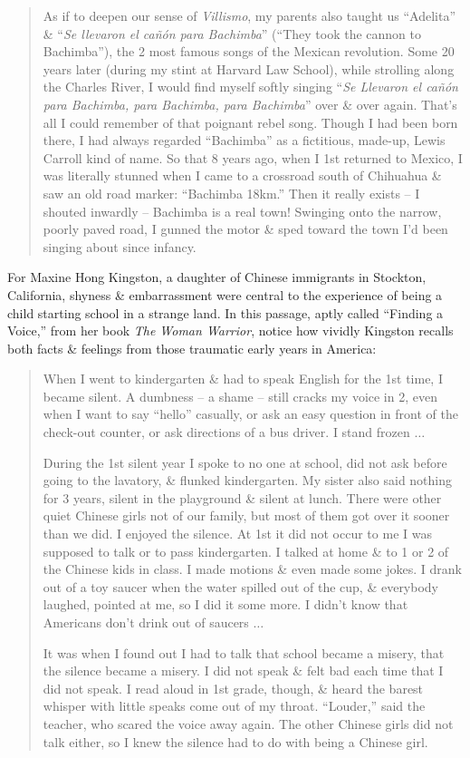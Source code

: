 \documentclass{article}
\begin{document}
\begin{quotation}
	As if to deepen our sense of \textit{Villismo}, my parents also taught us ``Adelita'' \& ``\textit{Se llevaron el ca\~{n}\'on para Bachimba}'' (``They took the cannon to Bachimba''), the 2 most famous songs of the Mexican revolution. Some 20 years later (during my stint at Harvard Law School), while strolling along the Charles River, I would find myself softly singing ``\textit{Se Llevaron el ca\~{n}\'on para Bachimba, para Bachimba, para Bachimba}'' over \& over again. That's all I could remember of that poignant rebel song. Though I had been born there, I had always regarded ``Bachimba'' as a fictitious, made-up, Lewis Carroll kind of name. So that 8 years ago, when I 1st returned to Mexico, I was literally stunned when I came to a crossroad south of Chihuahua \& saw an old road marker: ``Bachimba 18km.'' Then it really exists -- I shouted inwardly -- Bachimba is a real town! Swinging onto the narrow, poorly paved road, I gunned the motor \& sped toward the town I'd been singing about since infancy.
\end{quotation}
For Maxine Hong Kingston, a daughter of Chinese immigrants in Stockton, California, shyness \& embarrassment were central to the experience of being a child starting school in a strange land. In this passage, aptly called ``Finding a Voice,'' from her book \textit{The Woman Warrior}, notice how vividly Kingston recalls both facts \& feelings from those traumatic early years in America:
\begin{quotation}
	When I went to kindergarten \& had to speak English for the 1st time, I became silent. A dumbness -- a shame -- still cracks my voice in 2, even when I want to say ``hello'' casually, or ask an easy question in front of the check-out counter, or ask directions of a bus driver. I stand frozen $\ldots$
	
	During the 1st silent year I spoke to no one at school, did not ask before going to the lavatory, \& flunked kindergarten. My sister also said nothing for 3 years, silent in the playground \& silent at lunch. There were other quiet Chinese girls not of our family, but most of them got over it sooner than we did. I enjoyed the silence. At 1st it did not occur to me I was supposed to talk or to pass kindergarten. I talked at home \& to 1 or 2 of the Chinese kids in class. I made motions \& even made some jokes. I drank out of a toy saucer when the water spilled out of the cup, \& everybody laughed, pointed at me, so I did it some more. I didn't know that Americans don't drink out of saucers $\ldots$
	
	It was when I found out I had to talk that school became a misery, that the silence became a misery. I did not speak \& felt bad each time that I did not speak. I read aloud in 1st grade, though, \& heard the barest whisper with little speaks come out of my throat. ``Louder,'' said the teacher, who scared the voice away again. The other Chinese girls did not talk either, so I knew the silence had to do with being a Chinese girl.
\end{quotation}
\end{document}
